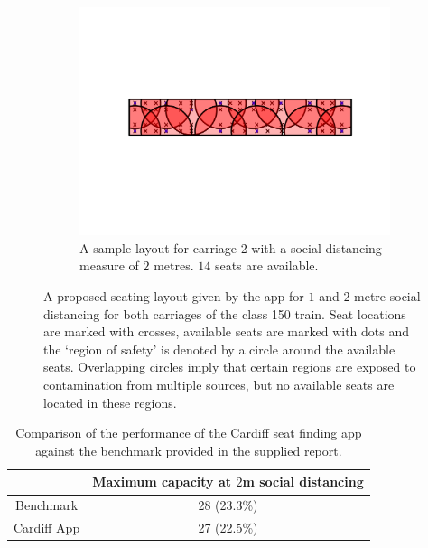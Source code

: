 \documentclass[11pt,a4paper]{article}
\begin{document}
\begin{figure}[ht!]
\begin{subfigure}[h]{0.490\linewidth}
\includegraphics[width = \linewidth]{class150_second_car_2m.png}
\caption{A sample layout for carriage 2 with a social distancing measure of $2$ metres. $14$ seats are available.}
\label{TwoMetre2}
\end{subfigure}
\caption{A proposed seating layout given by the app for $1$ and $2$ metre social distancing for both carriages of the class 150 train. Seat locations are marked with crosses, available seats are marked with dots and the `region of safety' is denoted by a circle around the available seats. Overlapping circles imply that certain regions are exposed to contamination from multiple sources, but no available seats are located in these regions. }
\label{Demonstration_pics}
\end{figure}


\begin{table}[ht!]
\begin{center}
 \begin{tabular}{|c |c|}
 \hline
& \textbf{Maximum capacity at $2$m social distancing }\\
 \hline

 Benchmark &   28 (23.3\%)\footnotemark \\
 \hline
 Cardiff App  & 27 (22.5\%)\\

\hline
\end{tabular}
\end{center}
\caption{Comparison of the performance of the Cardiff seat finding app against the benchmark provided in the supplied report.}
\label{tab:performance}
\end{table}
\end{document}
